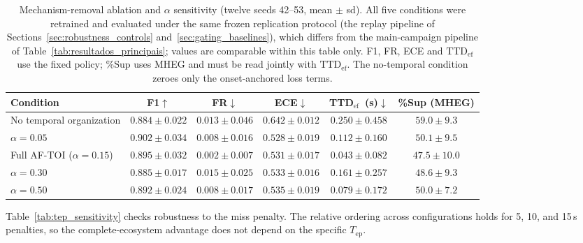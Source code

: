 \documentclass[a4paper,fleqn]{cas-dc}
\newcommand{\MHEG}{\mbox{MHEG}\xspace}
\begin{document}
\begin{table}[!tbp]
\color{\revcolor}
\centering
\caption{Mechanism-removal ablation and $\alpha$ sensitivity (twelve seeds
42--53, mean $\pm$ sd). All five conditions were retrained and evaluated
under the same frozen replication protocol (the replay pipeline of
Sections~\ref{sec:robustness_controls}
and~\ref{sec:gating_baselines}), which differs from the main-campaign
pipeline of Table~\ref{tab:resultados_principais}; values are comparable
within this table only. F1, FR, ECE and $\mathrm{TTD}_{\mathrm{ef}}$ use the
fixed policy; \%Sup uses \MHEG and must be read jointly with
$\mathrm{TTD}_{\mathrm{ef}}$. The no-temporal condition zeroes only the
onset-anchored loss terms.}
\label{tab:ablacao_alpha}
\footnotesize
\setlength{\tabcolsep}{5pt}
\renewcommand{\arraystretch}{1.2}
\begin{tabular}{l c c c c c}
\toprule
\textbf{Condition} & \textbf{F1}$\uparrow$ & \textbf{FR}$\downarrow$
  & \textbf{ECE}$\downarrow$ & \textbf{TTD$_{\mathrm{ef}}$~(s)}$\downarrow$
  & \textbf{\%Sup (MHEG)} \\
\midrule
No temporal organization & $0.884 \pm 0.022$ & $0.013 \pm 0.046$
  & $0.642 \pm 0.012$ & $0.250 \pm 0.458$ & $59.0 \pm 9.3$ \\
$\alpha=0.05$ & $0.902 \pm 0.034$ & $0.008 \pm 0.016$
  & $0.528 \pm 0.019$ & $0.112 \pm 0.160$ & $50.1 \pm 9.5$ \\
\rowcolor{gray!8}
Full \mbox{AF-TOI} ($\alpha=0.15$) & $0.895 \pm 0.032$ & $0.002 \pm 0.007$
  & $0.531 \pm 0.017$ & $\mathbf{0.043 \pm 0.082}$ & $47.5 \pm 10.0$ \\
$\alpha=0.30$ & $0.885 \pm 0.017$ & $0.015 \pm 0.025$
  & $0.533 \pm 0.016$ & $0.161 \pm 0.257$ & $48.6 \pm 9.3$ \\
$\alpha=0.50$ & $0.892 \pm 0.024$ & $0.008 \pm 0.017$
  & $0.535 \pm 0.019$ & $0.079 \pm 0.172$ & $50.0 \pm 7.2$ \\
\bottomrule
\end{tabular}
\end{table}
Table~\ref{tab:tep_sensitivity} checks robustness to the miss penalty. The
relative ordering across configurations holds for 5, 10, and 15\,s penalties,
so the complete-ecosystem advantage does not depend on the specific
$T_{\mathrm{ep}}$.
\end{document}

